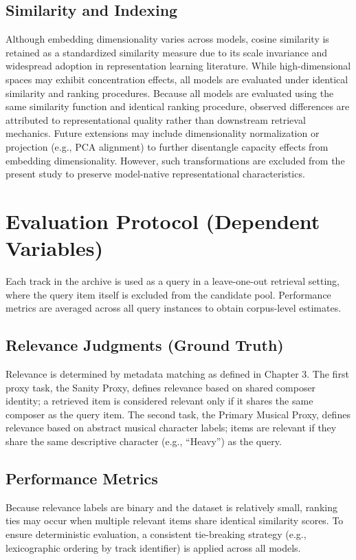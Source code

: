 \subsection{Similarity and Indexing}
Although embedding dimensionality varies across models, cosine similarity is retained as a standardized similarity measure due to its scale invariance and widespread adoption in representation learning literature. 
While high-dimensional spaces may exhibit concentration effects, all models are evaluated under identical similarity and ranking procedures. 
Because all models are evaluated using the same similarity function and identical ranking procedure, observed differences are attributed to representational quality rather than downstream retrieval mechanics.
Future extensions may include dimensionality normalization or projection (e.g., PCA alignment) to further disentangle capacity effects from embedding dimensionality. However, such transformations are excluded from the present study to preserve model-native representational characteristics.



\section{Evaluation Protocol (Dependent Variables)}
Each track in the archive is used as a query in a leave-one-out retrieval setting, where the query item itself is excluded from the candidate pool.
Performance metrics are averaged across all query instances to obtain corpus-level estimates.

\subsection{Relevance Judgments (Ground Truth)}
Relevance is determined by metadata matching as defined in Chapter 3. The first proxy task, the Sanity Proxy, defines relevance based on shared composer identity; a retrieved item is considered relevant only if it shares the same composer as the query item. The second task, the Primary Musical Proxy, defines relevance based on abstract musical character labels; items are relevant if they share the same descriptive character (e.g., ``Heavy'') as the query.

\subsection{Performance Metrics}

Because relevance labels are binary and the dataset is relatively small, ranking ties may occur when multiple relevant items share identical similarity scores. To ensure deterministic evaluation, a consistent tie-breaking strategy (e.g., lexicographic ordering by track identifier) is applied across all models.

